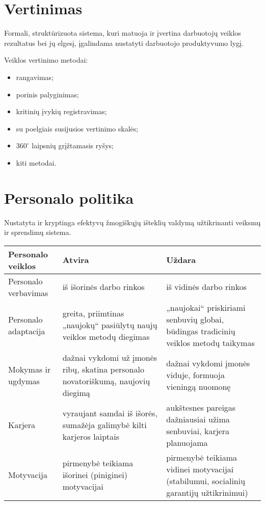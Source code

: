\section{Vertinimas}

\begin{defn}
  Formali, struktūrizuota sistema, kuri matuoja ir įvertina darbuotojų
  veiklos rezultatus bei jų elgesį, įgalindama nustatyti darbuotojo
  produktyvumo lygį.
\end{defn}

Veiklos vertinimo metodai:
\begin{itemize}
  \item rangavimas;
  \item porinis palyginimas;
  \item kritinių įvykių registravimas;
  \item su poelgiais susijusios vertinimo skalės;
  \item $360^{\circ}$ laipsnių grįžtamasis ryšys;
  \item kiti metodai.
\end{itemize}

\section{Personalo politika}

\begin{defn}
  Nustatyta ir kryptinga efektyvų žmogiškųjų išteklių valdymą užtikrinanti
  veiksmų ir sprendimų sistema.
\end{defn}

\begin{tabularx}{\textwidth}[]{l | X | X}
  Personalo veiklos & Atvira & Uždara \\
  \hline
  Personalo verbavimas
    & iš išorinės darbo rinkos
    & iš vidinės darbo rinkos \\
  \hline
  Personalo adaptacija
    & greita, priimtinas „naujokų“ pasiūlytų naujų veiklos metodų diegimas
    & „naujokai“ priskiriami senbuvių globai, būdingas tradicinių veiklos
      metodų taikymas \\
  \hline
  Mokymas ir ugdymas
    & dažnai vykdomi už įmonės ribų, skatina personalo novatoriškumą,
      naujovių diegimą
    & dažnai vykdomi įmonės viduje, formuoja vieningą nuomonę \\
  \hline
  Karjera
    & vyraujant samdai iš išorės, sumažėja galimybė kilti karjeros laiptais
    & aukštesnes pareigas dažniausiai užima senbuviai, karjera planuojama \\
  \hline
  Motyvacija
    & pirmenybė teikiama išorinei (piniginei) motyvacijai
    & pirmenybė teikiama vidinei motyvacijai (stabilumui, socialinių
      garantijų užtikrinimui)
\end{tabularx}

